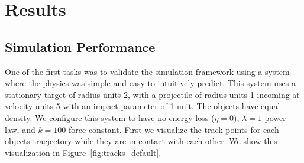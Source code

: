\documentclass[aps,prl,floatfix,preprint,nofootinbib]{revtex4}
\begin{document}
\section{Results}
\subsection{Simulation Performance}
One of the first tasks was to validate the simulation framework using a system where the physics was simple and easy to intuitively predict. This system uses a stationary target of radius units 2, with a projectile of radius units 1 incoming at velocity units 5 with an impact parameter of 1 unit. The objects have equal density. We configure this system to have no energy loss ($\eta = 0$), $\lambda=1$ power law, and $k=100$ force constant. First we visualize the track points for each objects tracjectory while they are in contact with each other. We show this visualization in Figure~\ref{fig:tracks_default}.
\end{document}
